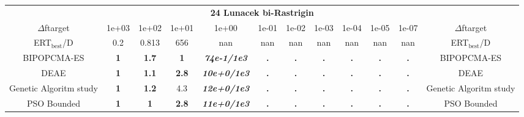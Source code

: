 \begin{tabular}{cccccccccccc}
 & \multicolumn{10}{c}{{\normalsize \textbf{24 Lunacek bi-Rastrigin}}}\\
$\Delta$ftarget& 1e+03& 1e+02& 1e+01& 1e+00& 1e-01& 1e-02& 1e-03& 1e-04& 1e-05& 1e-07 & $\Delta$ftarget \\
ERT$_{\textrm{best}}$/D& 0.2& 0.813& 656& nan& nan& nan& nan& nan& nan& nan & ERT$_{\textrm{best}}$/D \\
\hline
BIPOPCMA-ES & \textbf{1} & \textbf{1.7} & \textbf{1} & \textbf{\textit{74e-1}\textit{/1e3}} & \textbf{.} & \textbf{.} & \textbf{.} & \textbf{.} & \textbf{.} & \textbf{.} & BIPOPCMA-ES \cite{add_an_entry_for_BIPOPCMA-ES_in_bbob.bib}\\
DEAE & \textbf{1} & \textbf{1.1} & \textbf{2.8} & \textbf{\textit{10e+0}\textit{/1e3}} & \textbf{.} & \textbf{.} & \textbf{.} & \textbf{.} & \textbf{.} & \textbf{.} & DEAE \cite{add_an_entry_for_DEAE_in_bbob.bib}\\
Genetic Algoritm study & \textbf{1} & \textbf{1.2} & 4.3 & \textbf{\textit{12e+0}\textit{/1e3}} & \textbf{.} & \textbf{.} & \textbf{.} & \textbf{.} & \textbf{.} & \textbf{.} & Genetic Algoritm study \cite{add_an_entry_for_Genetic Algoritm study_in_bbob.bib}\\
PSO Bounded & \textbf{1} & \textbf{1} & \textbf{2.8} & \textbf{\textit{11e+0}\textit{/1e3}} & \textbf{.} & \textbf{.} & \textbf{.} & \textbf{.} & \textbf{.} & \textbf{.} & PSO Bounded \cite{add_an_entry_for_PSO Bounded_in_bbob.bib}
\end{tabular}
